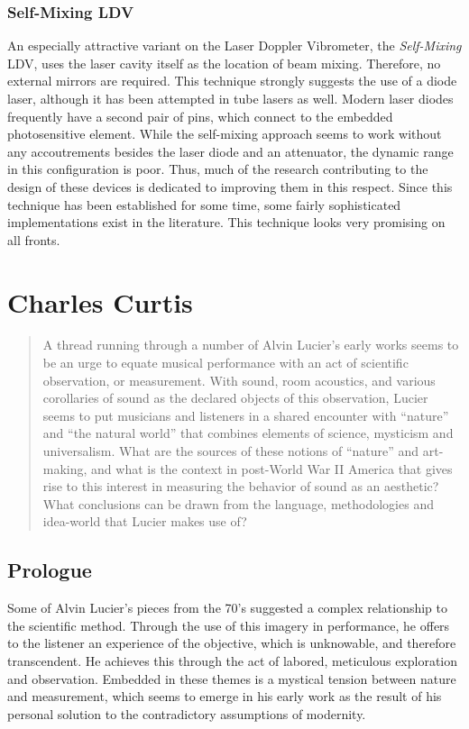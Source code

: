 \documentclass[a4paper,10pt]{report}
\numberwithin{equation}{section}
\begin{document}
 \subsection{Self-Mixing LDV}
 An especially attractive variant on the Laser Doppler Vibrometer, the \emph{Self-Mixing} LDV, uses the laser cavity itself as the location of beam mixing. Therefore, no external mirrors are required. This technique strongly suggests the use of a diode laser, although it has been attempted in tube lasers as well.\cite{Giuliani2003} Modern laser diodes frequently have a second pair of pins, which connect to the embedded photosensitive element. 
While the self-mixing approach seems to work without any accoutrements besides the laser diode and an attenuator, the dynamic range in this configuration is poor. Thus, much of the research contributing to the design of these devices is dedicated to improving them in this respect. 
Since this technique has been established for some time, some fairly sophisticated implementations exist in the literature. This technique looks very promising on all fronts. 

\chapter{Charles Curtis}
\begin{abstract}
 A thread running through a number of Alvin Lucier's early works seems to be an urge to equate musical performance with an act of scientific observation, or measurement. With sound, room acoustics, and various corollaries of sound as the declared objects of this observation, Lucier seems to put musicians and listeners in a shared encounter with ``nature'' and ``the natural world'' that combines elements of science, mysticism and universalism. What are the sources of these notions of ``nature'' and art-making, and what is the context in post-World War II America that gives rise to this interest in measuring the behavior of sound as an aesthetic? What conclusions can be drawn from the language, methodologies and idea-world that Lucier makes use of?
\end{abstract} 
\section{Prologue}
 Some of Alvin Lucier's pieces from the 70's suggested a complex relationship to the scientific method. Through the use of this imagery in performance, he offers to the listener an experience of the objective, which is unknowable, and therefore transcendent. He achieves this through the act of labored, meticulous exploration and observation. Embedded in these themes is a mystical tension between nature and measurement, which seems to emerge in his early work as the result of his personal solution to the contradictory assumptions of modernity.
\end{document}
